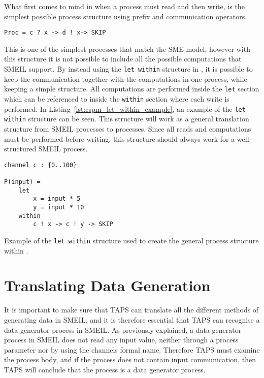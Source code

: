 What first comes to mind in \cspm{} when a process must read and then write, is the simplest possible process structure using prefix and communication operators.
\begin{verbatim}
Proc = c ? x -> d ! x-> SKIP
\end{verbatim}
This is one of the simplest \cspm{} processes that match the SME model, however with this structure it is not possible to include all the possible computations that SMEIL support. By instead using the \texttt{let within} structure in \cspm{}, it is possible to keep the communication together with the computations in one \cspm{} process, while keeping a simple structure. All computations are performed inside the \texttt{let} section which can be referenced to inside the \texttt{within} section where each write is performed.
In Listing~\ref{lst:cspm_let_within_example}, an example of the \texttt{let within} structure can be seen. This structure will work as a general translation structure from SMEIL processes to \cspm{} processes. Since all reads and computations must be performed before writing, this structure should always work for a well-structured SMEIL process.
\begin{listing}
\begin{verbatim}
channel c : {0..100}

P(input) =
    let
        x = input * 5
        y = input * 10
    within
        c ! x -> c ! y -> SKIP
\end{verbatim}
\caption{Example of the \texttt{let within} structure used to create the general process structure within \cspm{}.}
\label{lst:cspm_let_within_example}
\end{listing}
\section{Translating Data Generation}
It is important to make sure that TAPS can translate all the different methods of generating data in SMEIL, and it is therefore essential that TAPS can recognise a data generator process in SMEIL. As previously explained, a data generator process in SMEIL does not read any input value, neither through a process parameter nor by using the channels formal name. Therefore TAPS must examine the process body, and if the process does not contain input communication, then TAPS will conclude that the process is a data generator process. \\

